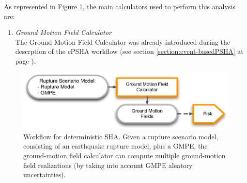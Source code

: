 As represented in Figure \ref{deterministic_workflow}, the main calculators 
used to perform this analysis are:
\begin{enumerate}
\item \emph{Ground Motion Field Calculator} \hfill \\
The Ground Motion Field Calculator was already 
introduced during the descrption of the ePSHA workflow (see section 
\ref{section:event-basedPSHA} at page \pageref{section:classicalPSHA}).
\end{enumerate}
\begin{figure}[!hb]
\centering
\includegraphics[width=14cm]{./Figures/Part_Hazard/deterministic_workflow.eps}
\caption{Workflow for deterministic SHA. Given a rupture scenario model, 
consisting of an earthquake rupture model, plus a GMPE, the ground-motion 
field calculator can compute multiple ground-motion field realizations (by 
taking into account GMPE aleatory uncertainties).}
\label{deterministic_workflow}
\end{figure}
%
%
%
